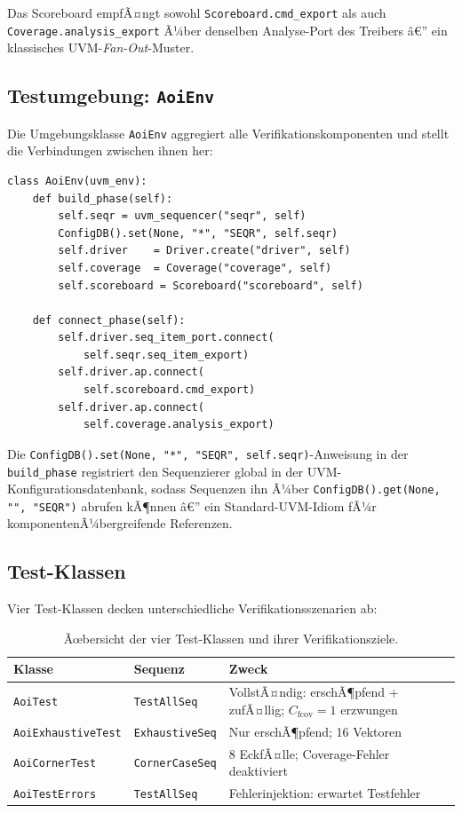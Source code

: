 ﻿\documentclass[12pt,a4paper]{report}
\begin{document}
Das Scoreboard empfÃ¤ngt sowohl \texttt{Scoreboard.cmd\_export} als auch
\texttt{Coverage.analy\newline sis\_export} Ã¼ber denselben Analyse-Port des Treibers â€”
ein klassisches UVM-\emph{Fan-Out}-Muster.

\subsection{Testumgebung: \texttt{AoiEnv}}
\label{sssec:aoi_env}

Die Umgebungsklasse \texttt{AoiEnv} aggregiert alle Verifikationskomponenten
und stellt die Verbindungen zwischen ihnen her:

\begin{lstlisting}[style=pythonstyle, caption={\texttt{AoiEnv}: Aufbau und Vernetzung}]
class AoiEnv(uvm_env):
    def build_phase(self):
        self.seqr = uvm_sequencer("seqr", self)
        ConfigDB().set(None, "*", "SEQR", self.seqr)
        self.driver    = Driver.create("driver", self)
        self.coverage  = Coverage("coverage", self)
        self.scoreboard = Scoreboard("scoreboard", self)

    def connect_phase(self):
        self.driver.seq_item_port.connect(
            self.seqr.seq_item_export)
        self.driver.ap.connect(
            self.scoreboard.cmd_export)
        self.driver.ap.connect(
            self.coverage.analysis_export)
\end{lstlisting}

Die \texttt{ConfigDB().set(None, "*", "SEQR", self.seqr)}-Anweisung in der
\texttt{build\_phase} registriert den Sequenzierer global in der
UVM-Konfigurationsdatenbank, sodass Sequenzen ihn Ã¼ber
\texttt{ConfigDB().get(None, "", "SEQR")} abrufen kÃ¶nnen â€” ein Standard-UVM-Idiom fÃ¼r
komponentenÃ¼bergreifende Referenzen.

\subsection{Test-Klassen}
\label{sssec:test_klassen}

Vier Test-Klassen decken unterschiedliche Verifikationsszenarien ab:

\begin{table}[H]
\centering
\begin{tabular}{|l|l|p{4.5cm}|}
\hline
\textbf{Klasse} & \textbf{Sequenz} & \textbf{Zweck} \\
\hline
\texttt{AoiTest} & \texttt{TestAllSeq} & VollstÃ¤ndig: erschÃ¶pfend + zufÃ¤llig; $C_{\mathrm{fcov}}=1$ erzwungen \\
\texttt{AoiExhaustiveTest} & \texttt{ExhaustiveSeq} & Nur erschÃ¶pfend; 16 Vektoren \\
\texttt{AoiCornerTest} & \texttt{CornerCaseSeq} & 8 EckfÃ¤lle; Coverage-Fehler deaktiviert \\
\texttt{AoiTestErrors} & \texttt{TestAllSeq} & Fehlerinjektion: erwartet Testfehler \\
\hline
\end{tabular}
\caption{Ãœbersicht der vier Test-Klassen und ihrer Verifikationsziele.}
\label{tab:test_klassen}
\end{table}
\end{document}
